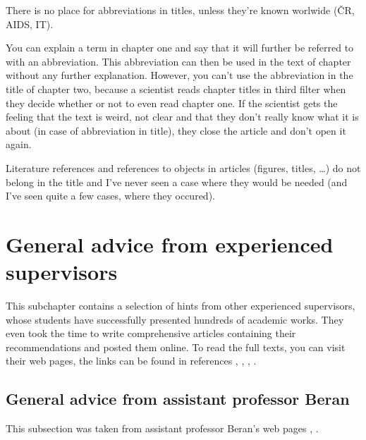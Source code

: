 There is no place for abbreviations in titles, unless they're known worlwide (ČR, AIDS, IT).

You can explain a term in chapter one and say that it will further be referred to with an abbreviation. This abbreviation can then be used in the text of chapter without any further explanation. However, you can't use the abbreviation in the title of chapter two, because a scientist reads chapter titles in third filter when they decide whether or not to even read chapter one. If the scientist gets the feeling that the text is weird, not clear and that they don't really know what it is about (in case of abbreviation in title), they close the article and don't open it again.

Literature references and references to objects in articles (figures, titles, \ldots) do not belong in the title and I've never seen a case where they would be needed (and I've seen quite a few cases, where they occured).


\section{General advice from experienced supervisors}

This subchapter contains a selection of hints from other experienced supervisors, whose students have successfully presented hundreds of academic works. They even took the time to write comprehensive articles containing their recommendations and posted them online. To read the full texts, you can visit their web pages, the links can be found in references \cite{Beran}, \cite{BeranPDF}, \cite{Cernocky}, \cite{Zemcik}.

\subsection*{General advice from assistant professor Beran}

This subsection was taken from assistant professor Beran's web pages \cite{Beran}, \cite{BeranPDF}.

